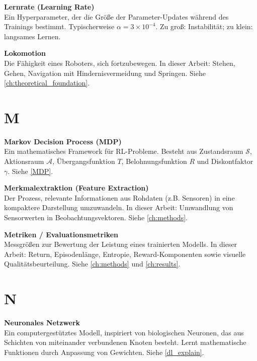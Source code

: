 \vspace{0.5cm}
\noindent\textbf{Lernrate (Learning Rate)} \\
Ein Hyperparameter, der die Größe der Parameter-Updates während des Trainings bestimmt. Typischerweise $\alpha = 3 \times 10^{-4}$. Zu groß: Instabilität; zu klein: langsames Lernen.

\vspace{0.5cm}
\noindent\textbf{Lokomotion} \\
Die Fähigkeit eines Roboters, sich fortzubewegen. In dieser Arbeit: Stehen, Gehen, Navigation mit Hindernisvermeidung und Springen. Siehe \autoref{ch:theoretical_foundation}.

\section*{M}

\vspace{0.3cm}
\noindent\textbf{Markov Decision Process (MDP)} \\
Ein mathematisches Framework für RL-Probleme. Besteht aus Zustandsraum $\mathcal{S}$, Aktionsraum $\mathcal{A}$, Übergangsfunktion $T$, Belohnungsfunktion $R$ und Diskontfaktor $\gamma$. Siehe \autoref{MDP}.

\vspace{0.5cm}
\noindent\textbf{Merkmalextraktion (Feature Extraction)} \\
Der Prozess, relevante Informationen aus Rohdaten (z.B. Sensoren) in eine kompaktere Darstellung umzuwandeln. In dieser Arbeit: Umwandlung von Sensorwerten in Beobachtungsvektoren. Siehe \autoref{ch:methods}.

\vspace{0.5cm}
\noindent\textbf{Metriken / Evaluationsmetriken} \\
Messgrößen zur Bewertung der Leistung eines trainierten Modells. In dieser Arbeit: Return, Episodenlänge, Entropie, Reward-Komponenten sowie visuelle Qualitätsbeurteilung. Siehe \autoref{ch:methods} und \autoref{ch:results}.

\section*{N}

\vspace{0.3cm}
\noindent\textbf{Neuronales Netzwerk} \\
Ein computergestütztes Modell, inspiriert von biologischen Neuronen, das aus Schichten von miteinander verbundenen Knoten besteht. Lernt mathematische Funktionen durch Anpassung von Gewichten. Siehe \autoref{dl_explain}.

